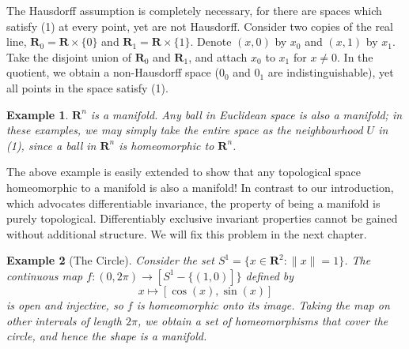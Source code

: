\documentclass[12pt]{report}
\theoremstyle{plain}
\newtheorem*{example}{Example}
\theoremstyle{definition}
\begin{document}
The Hausdorff assumption is completely necessary, for there are spaces which satisfy (1) at every point, yet are not Hausdorff. Consider two copies of the real line, $\mathbf{R}_0 = \mathbf{R} \times \{0\}$ and $\mathbf{R}_1 = \mathbf{R} \times \{1\}$. Denote $(x,0)$ by $x_0$ and $(x, 1)$ by $x_1$. Take the disjoint union of $\mathbf{R}_0$ and $\mathbf{R}_1$, and attach $x_0$ to $x_1$ for $x \neq 0$. In the quotient, we obtain a non-Hausdorff space ($0_0$ and $0_1$ are indistinguishable), yet all points in the space satisfy (1).


\begin{example}
    $\mathbf{R}^n$ is a manifold. Any ball in Euclidean space is also a manifold; in these examples, we may simply take the entire space as the neighbourhood $U$ in (1), since a ball in $\mathbf{R}^n$ is homeomorphic to $\mathbf{R}^n$.
\end{example}

The above example is easily extended to show that any topological space homeomorphic to a manifold is also a manifold! In contrast to our introduction, which advocates differentiable invariance, the property of being a manifold is purely topological. Differentiably exclusive invariant properties cannot be gained without additional structure. We will fix this problem in the next chapter.

\begin{example}[The Circle]
    Consider the set $S^1 = \{ x \in \mathbf{R}^2 : \|x\| = 1 \}$. The continuous map $f: (0, 2\pi) \to [S^1 - \{ (1,0)] \}$ defined by
    \[ x \mapsto [\cos(x), \sin(x)] \]
    is open and injective, so $f$ is homeomorphic onto its image. Taking the map on other intervals of length $2\pi$, we obtain a set of homeomorphisms that cover the circle, and hence the shape is a manifold.
\end{example}
\end{document}
